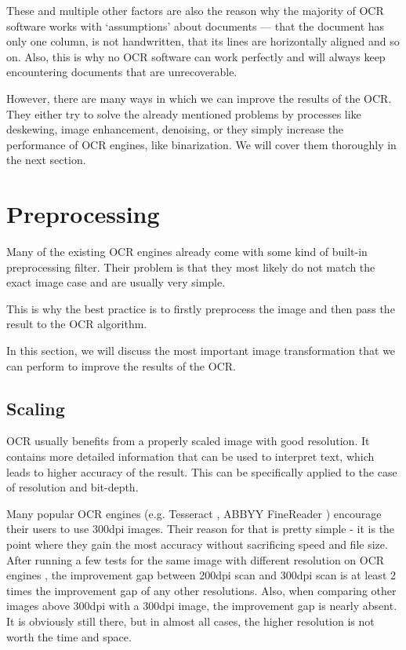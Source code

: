 These and multiple other factors are also the reason why the majority of OCR software works with `assumptions' about documents --- that the document has only one column, is not handwritten, that its lines are horizontally aligned and so on. Also, this is why no OCR software can work perfectly and will always keep encountering documents that are unrecoverable. 

However, there are many ways in which we can improve the results of the OCR. They either try to solve the already mentioned problems by processes like deskewing, image enhancement, denoising, or they simply increase the performance of OCR engines, like binarization. We will cover them thoroughly in the next section.

\section{Preprocessing}

Many of the existing OCR engines already come with some kind of built-in preprocessing filter. Their problem is that they most likely do not match the exact image case and are usually very simple.

This is why the best practice is to firstly preprocess the image and then pass the result to the OCR algorithm.

In this section, we will discuss the most important image transformation that we can perform to improve the results of the OCR. 

\subsection{Scaling}


OCR usually benefits from a properly scaled image with good resolution. It contains more detailed information that can be used to interpret text, which leads to higher accuracy of the result. This can be specifically applied to the case of resolution and bit-depth.

Many popular OCR engines (e.g. Tesseract \citep{TesseractQual}, ABBYY FineReader \citep{ABBYYdpi}) encourage their users to use 300dpi images. Their reason for that is pretty simple - it is the point where they gain the most accuracy without sacrificing speed and file size. After running a few tests for the same image with different resolution on OCR engines \citep{preprocessAll}, the improvement gap between 200dpi scan and 300dpi scan is at least 2 times the improvement gap of any other resolutions. Also, when comparing other images above 300dpi with a 300dpi image, the improvement gap is nearly absent. It is obviously still there, but in almost all cases, the higher resolution is not worth the time and space. 

